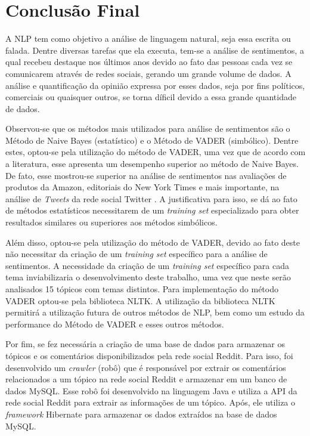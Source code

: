 \chapter{Conclusão Final}
\label{cap:conclusao}
A \ac{NLP} tem como objetivo a análise de linguagem natural, seja
essa escrita ou falada. Dentre diversas tarefas que ela executa, tem-se a
análise de sentimentos, a qual recebeu destaque nos últimos anos devido ao fato das pessoas cada vez se comunicarem através de redes sociais,
gerando um grande volume de dados. A análise e quantificação da opinião expressa por esses dados, seja
por fins políticos, comerciais ou quaisquer outros, se torna díficil devido a
essa grande quantidade de dados.

Observou-se que os métodos mais utilizados para análise de sentimentos são o
Método de Naive Bayes (estatístico) e o Método de \ac{VADER} (simbólico). Dentre
estes, optou-se pela utilização do método de \ac{VADER}, uma vez que de acordo
com a literatura, esse apresenta um desempenho superior ao método de Naive
Bayes. De fato, esse mostrou-se superior na análise de sentimentos nas avaliações de
produtos da Amazon, editoriais do New York Times e mais importante, na análise
de \textit{Tweets} da rede social Twitter \cite{SentimentinSocialMedia}. A
justificativa para isso, se dá ao fato de métodos estatísticos necessitarem de um \textit{training set}
especializado para obter resultados similares ou superiores aos métodos
simbólicos. 

Além disso, optou-se pela utilização do método de \ac{VADER}, devido
ao fato deste não necessitar da criação de um \textit{training set} específico
para a análise de sentimentos. A necessidade da criação de um \textit{training
set} específico para cada tema inviabilizaria o desenvolvimento deste trabalho,
uma vez que neste serão analisados 15 tópicos com temas distintos. Para
implementação do método \ac{VADER} optou-se pela biblioteca \ac{NLTK}. A
utilização da biblioteca \ac{NLTK} permitirá a utilização futura de outros
métodos de \ac{NLP}, bem como um estudo da performance do Método de \ac{VADER} e esses outros métodos.
 
Por fim, se fez necessária a criação de uma base de dados para armazenar os
tópicos e os comentários disponibilizados pela rede social Reddit. Para isso,
foi desenvolvido um \textit{crawler} (robô) que é responsável por extrair os
comentários relacionados a um tópico na rede social Reddit e armazenar em um
banco de dados MySQL. Esse robô foi desenvolvido na linguagem Java e utiliza a
API da rede social Reddit para extrair as informações de um tópico. Após, ele
utiliza o \textit{framework} Hibernate para armazenar os dados extraídos na
base de dados MySQL.


